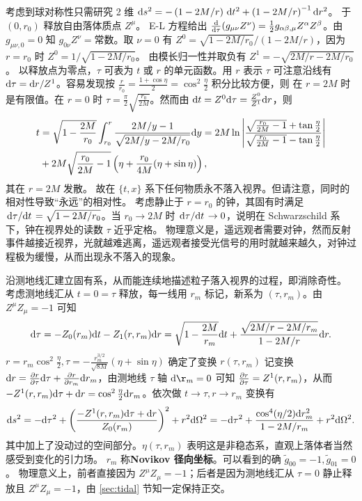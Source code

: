 考虑到球对称性只需研究 2 维 $\dd s^2=-\left(1-{2M}/{r}\right)\,\text d t^2+\left(1-{2M}/{r}\right)^{-1}\text d r^2$。
于 $(0,r_0)$ 释放自由落体质点 $Z^\mu$。
E-L 方程给出 $\dv{\tau}(g_{\mu\nu} Z^\nu)=\frac 12 g_{\alpha\beta,\mu} Z^\alpha Z^\beta$。由 $g_{\mu\nu,0}=0$ 知 $g_{0\nu} Z^\nu=\text{常数}$。取 $\nu=0$ 有 $Z^0=\sqrt{1-2M/r_0}/(1-{2M}/{r})$，因为 $r=r_0$ 时 $Z^0=1/\sqrt{1-2M/r_0}$。
由模长归一性并取负有 $Z^1=-\sqrt{2M/{r}-2M/{r_0}}$。
以释放点为零点，$\tau$ 可表为 $t$ 或 $r$ 的单元函数。用 $r$ 表示 $\tau$ 可注意沿线有 $\dd\tau =\dd r/Z^1$。容易发现按 $\frac{r}{r_0}=\frac{1+\cos\eta}{2}=\cos^2 \frac{\eta}{2}$ 积分比较方便，则
在 $r=2M$ 时是有限值。在 $r=0$ 时 $\tau=\frac{\pi}{2}\sqrt{\frac{r_0}{2M}}$。然而由 $\dd t=Z^0\dd\tau=\frac{Z^0}{Z^1}\dd r$，则
\begin{align}
    t &= \sqrt{1-\frac{2M}{r_0}}\int_{r_0}^r \frac{{2M}/{y}-1}{\sqrt{2M/{y}-2M/{r_0}}}\dd y = 2M \ln \left| 
\frac{\sqrt{\frac{r_0}{2M}-1} + \tan \frac{\eta}{2}}
     {\sqrt{\frac{r_0}{2M}-1} - \tan \frac{\eta}{2}}
\right|\nonumber\\
    & + 2M \sqrt{\frac{r_0}{2M}-1}\left(\eta+\frac{r_0}{4M}(\eta+\sin\eta)\right),
\end{align}
其在 $r=2M$ 发散。
故在 $\{t,x\}$ 系下任何物质永不落入视界。但请注意，同时的相对性导致“永远”的相对性。
考虑静止于 $r=r_0$ 的钟，其固有时满足 $\dv*{\tau}{t}={\sqrt{1-2M/r_0}}$。当 $r_0\to 2M$ 时 $\dv*{\tau}{t}\to 0$，说明在 Schwarzschild 系下，钟在视界处的读数 $\tau$ 近乎定格。
物理意义是，遥远观者需要对钟，然而反射事件越接近视界，光就越难逃离，遥远观者接受光信号的用时就越来越久，对钟过程极为缓慢，从而出现永不落入的现象。

沿测地线汇建立固有系，从而能连续地描述粒子落入视界的过程，即消除奇性。
考虑测地线汇从 $t = 0 = \tau$ 释放，每一线用 $r_m$ 标记，新系为 $(\tau,r_m)$。由 $Z^\mu Z_\mu = -1$ 可知
\[\dd\tau=-Z_0(r_m)\dd t-Z_1(r,r_m)\dd r=\sqrt{1-\frac{2M}{r_m}}\dd t+\frac{\sqrt{2M/{r}-2M/{r_m}}}{1-{2M}/{r}}\dd r.\]
$r = r_m\cos^2\frac{\eta}{2},\tau = -\frac{r_m^{3/2}}{\sqrt{8M}} (\eta+\sin\eta)$ 确定了变换 $r(\tau,r_m)$
记变换 $\dd r = \pdv{r}{\tau}\dd\tau + \pdv{r}{r_m}\dd r_m$，由测地线 $\tau$ 轴 $\d\r_m = 0$ 可知 $\pdv{r}{\tau} = Z^1(r,r_m)$，从而 $-Z^1(r,r_m)\dd\tau+\dd r=\cos^2\frac{\eta}{2}\dd r_m$。依次做 $t\to\tau,r\to r_m$ 变换有
\[\dd s^2 = -\dd\tau^2+\left(\frac{-Z^1(r,r_m)\dd\tau+\dd r}{Z_0(r_m)}\right)^2+r^2\dd\Omega^2= -\dd\tau^2+\frac{\cos^4({\eta}/{2})\dd r_m^2}{1-2M/r_m}+r^2\dd\Omega^2.\]
其中加上了没动过的空间部分。$\eta(\tau,r_m)$ 表明这是非稳态系，直观上落体者当然感受到变化的引力场。
$r_m$ 称\textbf{Novikov 径向坐标}。可以看到的确 $\tilde g_{00}=-1,\tilde g_{01}=0$。
物理意义上，前者直接因为 $Z^\mu Z_\mu = -1$；后者是因为测地线汇从 $\tau = 0$ 静止释放且 $Z^\mu Z_\mu = -1$，由 \ref{sec:tidal} 节知一定保持正交。

